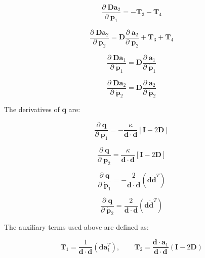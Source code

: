 \documentclass[]{article}
\newcommand{\pd}[2]{\frac{\partial\;#1}{\partial\;#2}}
\begin{document}
\begin{equation*}
    \pd{\mathbf{D} \mathbf{a}_2}{\mathbf{p}_1} = -\mathbf{T}_3 - \mathbf{T}_4
\end{equation*}

\begin{equation*}
    \pd{\mathbf{D} \mathbf{a}_2}{\mathbf{p}_2} = \mathbf{D} \pd{\mathbf{a}_2}{\mathbf{p}_2} + \mathbf{T}_3 + \mathbf{T}_4
\end{equation*}

\begin{equation*}
    \pd{\mathbf{D} \mathbf{a}_1}{\dot{\mathbf{p}}_1} = \mathbf{D} \pd{\mathbf{a}_1}{\dot{\mathbf{p}}_1}
\end{equation*}

\begin{equation*}
    \pd{\mathbf{D} \mathbf{a}_2}{\dot{\mathbf{p}}_2} = \mathbf{D} \pd{\mathbf{a}_2}{\dot{\mathbf{p}}_2}
\end{equation*}

The derivatives of $\mathbf{q}$ are:

\begin{equation}
    \pd{\mathbf{q}}{\mathbf{p}_1} = -\frac{\kappa}{\mathbf{d} \cdot \mathbf{d}} \left[ \mathbf{I} - 2\mathbf{D} \right]
\end{equation}

\begin{equation}
    \pd{\mathbf{q}}{\mathbf{p}_2} = \frac{\kappa}{\mathbf{d} \cdot \mathbf{d}} \left[ \mathbf{I} - 2\mathbf{D} \right]
\end{equation}

\begin{equation}
    \pd{\mathbf{q}}{\dot{\mathbf{p}}_1} = -\frac{2}{\mathbf{d} \cdot \mathbf{d}} (\mathbf{d} \dot{\mathbf{d}}^T)
\end{equation}

\begin{equation}
    \pd{\mathbf{q}}{\dot{\mathbf{p}}_2} = \frac{2}{\mathbf{d} \cdot \mathbf{d}} (\mathbf{d} \dot{\mathbf{d}}^T)
\end{equation}

The auxiliary terms used above are defined as:

\begin{equation*}
    \mathbf{T}_1 = \frac{1}{\mathbf{d} \cdot \mathbf{d}} (\mathbf{d} \mathbf{a}_1^T), \quad\quad \mathbf{T}_2 = \frac{\mathbf{d}\cdot\mathbf{a}_1}{\mathbf{d} \cdot \mathbf{d}} (\mathbf{I} - 2 \mathbf{D})
\end{equation*}
\end{document}
